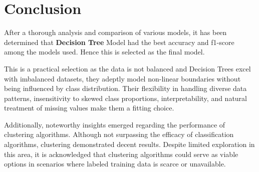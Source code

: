 \documentclass{article}
\begin{document}
\section{Conclusion}


After a thorough analysis and comparison of various models, it has been determined that \textbf{Decision Tree} Model had the best accuracy and f1-score among the models used. Hence this is selected as the final model.

This is a practical selection as the data is not balanced and Decision Trees excel with imbalanced datasets, they adeptly model non-linear boundaries without being influenced by class distribution. Their flexibility in handling diverse data patterns, insensitivity to skewed class proportions, interpretability, and natural treatment of missing values make them a fitting choice.

Additionally, noteworthy insights emerged regarding the performance of clustering algorithms. Although not surpassing the efficacy of classification algorithms, clustering demonstrated decent results. Despite limited exploration in this area, it is acknowledged that clustering algorithms could serve as viable options in scenarios where labeled training data is scarce or unavailable.
\end{document}
